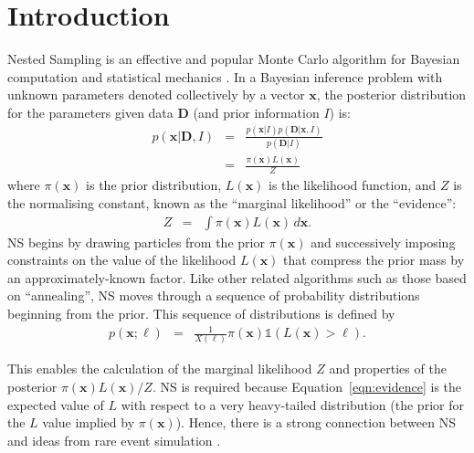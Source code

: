 \documentclass[journal,article,accept,moreauthors,pdftex,12pt,a4paper]{mdpi}
\newcommand{\xx}{\boldsymbol{x}}
\newcommand{\dx}{d\boldsymbol{x}}
\newcommand{\data}{\boldsymbol{D}}
\begin{document}

\section{Introduction}
Nested Sampling \citep[NS][]{skilling} is an effective and popular
Monte Carlo algorithm for Bayesian computation and
statistical mechanics
\citep{2009arXiv0906.3544P, 2014PhRvE..89b2302P, 2015arXiv150303404B}.
In a Bayesian inference problem with unknown parameters denoted collectively
by a vector $\xx$, the
posterior distribution for the parameters given data $\data$ (and prior
information $I$) is:
\begin{eqnarray}
p(\xx | \data, I) &=&
\frac{p(\xx | I)p(\data | \xx, I)}{p(\data | I)}\\
&=& \frac{\pi(\xx)L(\xx)}{Z}
\end{eqnarray}
where $\pi(\xx)$ is the prior distribution, $L(\xx)$ is the likelihood
function, and $Z$ is the normalising constant, known as the
``marginal likelihood'' or the ``evidence'':
\begin{eqnarray}
Z &=& \int \pi(\xx) L(\xx) \, \dx.\label{eqn:evidence}
\end{eqnarray}
NS begins by drawing particles from the
prior $\pi(\xx)$ and successively imposing constraints on the value of
the likelihood $L(\xx)$ that compress the prior mass by an
approximately-known factor. Like other related algorithms such as those
based on ``annealing'', NS
moves through a sequence of probability distributions beginning from the
prior. This sequence of distributions is defined by
\begin{eqnarray}
p(\xx; \ell) &=& \frac{1}{X(\ell)}\pi(\xx)\mathds{1}\left(L(\xx) > \ell\right).
\end{eqnarray}

This enables the calculation of the marginal likelihood $Z$
and properties of the posterior $\pi(\xx)L(\xx)/Z$.
NS is required because Equation~\ref{eqn:evidence}
is the expected value of $L$ with respect to a very heavy-tailed distribution
(the prior for the $L$ value implied by $\pi(\xx)$). Hence, there is a strong
connection between NS and ideas from rare event simulation \citep{walter}.
\end{document}
